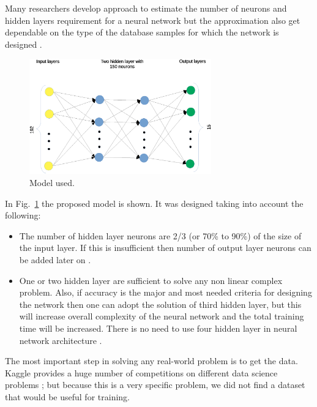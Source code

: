 \documentclass[runningheads]{llncs}
\begin{document}
Many researchers develop approach to estimate the number of neurons and hidden layers requirement for a neural network but the approximation also get dependable on the type of the
database samples for which the network is designed \cite{Karsoliya2012}.
\begin{figure}
	\begin{center}
		\includegraphics[width=0.7\textwidth]{models2.eps}
		\caption{Model used.} \label{ann}
	\end{center}
\end{figure}

In Fig.~\ref{ann} the proposed model is shown. It was designed taking into account the following:
\begin{itemize}
	\item The number of hidden layer neurons are 2/3 (or 70\% to 90\%) of the size of the input layer. If this is insufficient then number of output layer neurons can be added later on \cite{Boger1997}.
	\item One or two hidden layer are sufficient to solve any non linear complex problem. Also, if accuracy is the major and most needed criteria for designing the network then one can adopt the solution of third hidden layer, but this will increase overall complexity of the neural network and the total training time will be increased. There is no need to use four hidden layer in neural network architecture \cite{Karsoliya2012}.
\end{itemize}
The most important step in solving any real-world problem is to get the data. Kaggle provides a huge number of competitions on different data science problems \cite{Subramanian2018}; but because this is a very specific problem, we did not find a dataset that would be useful for training.
\end{document}
